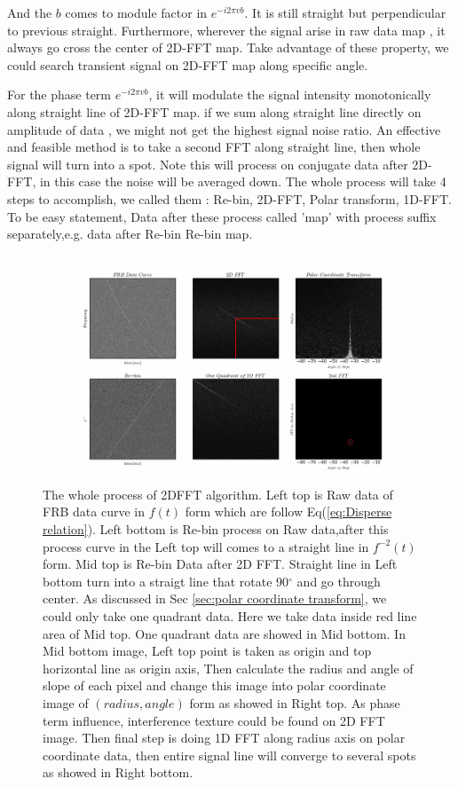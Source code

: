 \documentclass[iop]{emulateapj}
\begin{document}
And the $b$ comes to module factor in $e^{-i2\pi vb}$. It is still straight but perpendicular to previous straight. Furthermore,  wherever the signal arise in raw data map , it always go cross the center of 2D-FFT map. Take advantage of these property, we could search transient signal on 2D-FFT map along specific angle. 

For the phase term $e^{-i2\pi vb}$, it will modulate the signal intensity monotonically along straight line of 2D-FFT map. if we sum along straight line directly on amplitude of data , we might not get the highest signal noise ratio. An effective and feasible method is to take a second FFT along straight line, then whole signal will turn into a spot. Note this will process on conjugate data after 2D-FFT, in this case the noise will be averaged down. The whole process will take 4 steps to accomplish, we called them : Re-bin, 2D-FFT, Polar transform, 1D-FFT. To be easy statement,  Data after these process called 'map' with process suffix separately,e.g. data after Re-bin  Re-bin map.


\begin{figure}

\centering
\includegraphics[width=180mm]{./pictures/procedure1.png}
\caption{The whole process of 2DFFT algorithm. Left top is Raw data of FRB data curve in $f(t)$ form which are follow Eq(\ref{eq:Disperse relation}). Left bottom is Re-bin process on Raw data,after this process curve in the Left top will comes to a straight line in $f^{-2}(t)$ form. Mid top is Re-bin Data after 2D FFT. Straight line in Left bottom turn into a straigt line that rotate 90$^{\circ}$ and go through center. As discussed in Sec \ref{sec:polar coordinate transform}, we could only take one quadrant data. Here we take data inside red line area of Mid top. One quadrant data are showed in Mid bottom. In Mid bottom image, Left top point is taken as origin and top horizontal line as origin axis, Then calculate the radius and angle of slope of each pixel and change this image into polar coordinate image of $(radius,angle)$ form as showed in Right top. As phase term influence, interference 	texture could be found on 2D FFT image. Then final step is doing 1D FFT along radius axis on polar coordinate data, then entire signal line will converge to several spots as showed in Right bottom.  \label{fig:Procedure}}
\end{figure}
\end{document}
